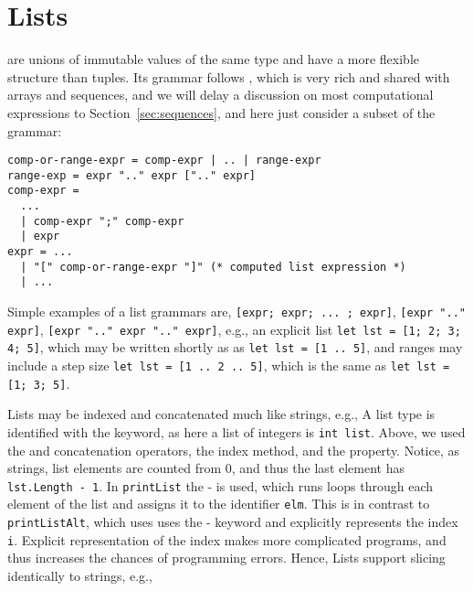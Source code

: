 \section{Lists}
 are unions of immutable values of the same type and have a more flexible structure than tuples. Its grammar follows , which is very rich and shared with arrays and sequences, and we will delay a discussion on most computational expressions to Section~\ref{sec:sequences}, and here just consider a subset of the grammar:
\begin{lstlisting}[language=ebnf]
comp-or-range-expr = comp-expr | .. | range-expr
range-exp = expr ".." expr [".." expr]
comp-expr =
  ...
  | comp-expr ";" comp-expr
  | expr
expr = ... 
  | "[" comp-or-range-expr "]" (* computed list expression *)
  | ...
\end{lstlisting}
Simple examples of a list grammars are, \lstinline[language=ebnf]![expr; expr; ... ; expr]!, \lstinline[language=ebnf]![expr ".." expr]!, \lstinline[language=ebnf]![expr ".." expr ".." expr]!, e.g., an explicit list \lstinline!let lst = [1; 2; 3; 4; 5]!, which may be written shortly as  as \lstinline!let lst = [1 .. 5]!, and ranges may include a step size \lstinline!let lst = [1 .. 2 .. 5]!, which is the same as \lstinline!let lst = [1; 3; 5]!.

Lists may be indexed and concatenated much like strings, e.g.,
%
%
A list type is identified with the  keyword, as here a list of integers is \lstinline!int list!. Above, we used the  and \idx{\lexeme{::}} concatenation operators, the  index method, and the  property. Notice, as strings, list elements are counted from 0, and thus the last element has \lstinline!lst.Length - 1!. In \lstinline!printList! the - is used, which runs loops through each element of the list and assigns it to the identifier \lstinline!elm!. This is in contrast to \lstinline!printListAlt!, which uses uses the - keyword and explicitly represents the index \lstinline!i!. Explicit representation of the index makes more complicated programs, and thus increases the chances of programming errors. Hence,  Lists support slicing identically to strings, e.g.,
%
%


